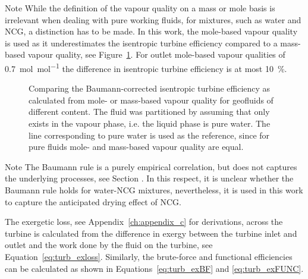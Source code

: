         \begin{notes}{Note}
            While the definition of the vapour quality on a mass or mole basis is irrelevant when dealing with pure working fluids, for mixtures, such as water and \ac{NCG}, a distinction has to be made. In this work, the mole-based vapour quality is used as it underestimates the isentropic turbine efficiency compared to a mass-based vapour quality, see Figure~\ref{fig:Baumann_comparison}. For outlet mole-based vapour qualities of \qty{0.7}{\mole\per\mole} the difference in isentropic turbine efficiency is at most \qty{10}{\percent}.

        \begin{figure}[H]
            \centering
            \resizebox{0.9\linewidth}{!}{}
            \caption[Comparing the Baumann-corrected isentropic turbine efficiency as calculated from mole- or mass-based vapour quality for geofluids of different  content.]{Comparing the Baumann-corrected isentropic turbine efficiency as calculated from mole- or mass-based vapour quality for geofluids of different  content. The fluid was partitioned by assuming that  only exists in the vapour phase, i.e. the liquid phase is pure water. The line corresponding to pure water is used as the reference, since for pure fluids mole- and mass-based vapour quality are equal.}
            \label{fig:Baumann_comparison}
        \end{figure}
            
        \end{notes}

        \begin{notes}{Note}
            The Baumann rule is a purely empirical correlation, but does not captures the underlying processes, see Section . In this respect, it is unclear whether the Baumann rule holds for water-\ac{NCG} mixtures, nevertheless, it is used in this work to capture the anticipated drying effect of \ac{NCG}.
        \end{notes}

        The exergetic loss, see Appendix~\ref{ch:appendix_c} for derivations, across the turbine is calculated from the difference in exergy between the turbine inlet and outlet and the work done by the fluid on the turbine, see Equation~\ref{eq:turb_exloss}. Similarly, the brute-force and functional efficiencies can be calculated as shown in Equations~\ref{eq:turb_exBF} and \ref{eq:turb_exFUNC}.

